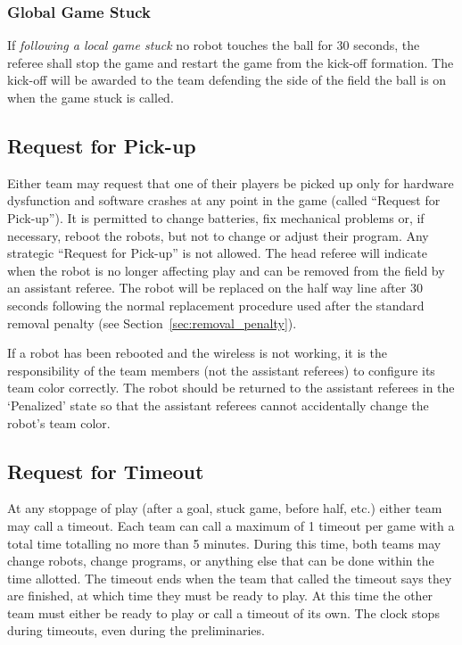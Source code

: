 \documentclass[12pt]{article}
\begin{document}
\subsubsection{Global Game Stuck}
If 
\emph{following a local game stuck} no robot touches the ball for 30 seconds, the referee shall stop
the game and restart the game from the kick-off formation. The
kick-off will be awarded to the team defending the side of the field
the ball is on when the game stuck is called.

\subsection{Request for Pick-up}
Either team may request that one of their players be picked up only
for hardware dysfunction and software crashes at any point in the
game (called ``Request for Pick-up''). It is permitted to change
batteries, fix mechanical problems or, if necessary, reboot the
robots, but not to change or adjust their program. Any strategic
``Request for Pick-up'' is not allowed.  The head referee will
indicate when the robot is no longer affecting play and can be
removed from the field by an assistant referee.  The robot will be
replaced on the half way line after 30 seconds following the normal
replacement procedure used after the standard removal penalty (see
Section~\ref{sec:removal_penalty}).

If a robot has been rebooted and the wireless is not working, it is
the responsibility of the team members (not the assistant referees)
to configure its team color correctly.  The robot should be returned
to the assistant referees in the `Penalized' state so that the
assistant referees cannot accidentally change the robot's team color.

\subsection{Request for Timeout}

At any stoppage of play (after a goal, stuck game, before half,
etc.) either team may call a timeout.  Each team can call a maximum
of 1 timeout per game with a total time totalling no more than 5
minutes.  During this time, both teams may change robots, change
programs, or anything else that can be done within the time
allotted.  The timeout ends when the team that called the timeout
says they are finished, at which time they must be ready to play. At
this time the other team must either be ready to play or call a
timeout of its own.  The clock stops during timeouts, even during
the preliminaries.
\end{document}
